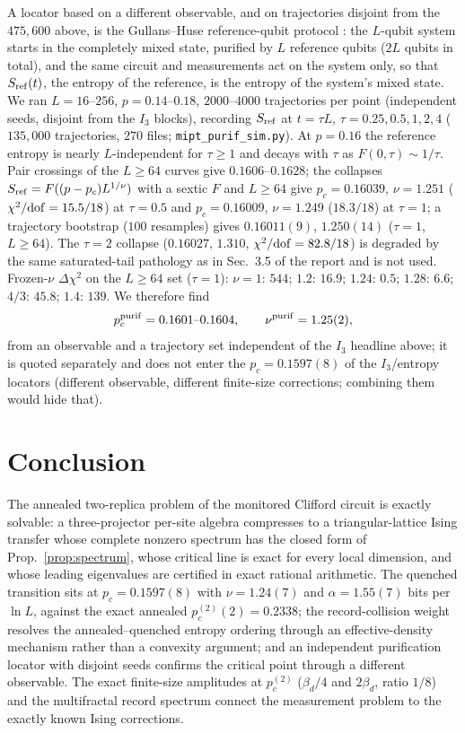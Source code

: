 \documentclass[11pt]{article}
\newcommand{\pctwo}{p_c^{(2)}}
\begin{document}
A locator based on a different observable, and on trajectories disjoint from
the $475{,}600$ above, is the Gullans--Huse reference-qubit protocol
\citep{Gullans2020}: the $L$-qubit system starts in the completely mixed
state, purified by $L$ reference qubits ($2L$ qubits in total), and the same
circuit and measurements act on the system only, so that $S_{\rm ref}(t)$,
the entropy of the reference, is the entropy of the system's mixed state.
We ran $L=16$--$256$, $p=0.14$--$0.18$, $2000$--$4000$ trajectories per
point (independent seeds, disjoint from the $I_3$ blocks), recording
$S_{\rm ref}$ at $t=\tau L$, $\tau=0.25,0.5,1,2,4$ ($135{,}000$
trajectories, $270$ files; \texttt{mipt\_purif\_sim.py}).  At $p=0.16$ the
reference entropy is nearly $L$-independent for $\tau\ge1$ and decays with
$\tau$ as $F(0,\tau)\sim1/\tau$.  Pair crossings of the $L\ge64$ curves give
$0.1606$--$0.1628$; the collapses $S_{\rm ref}=F((p-p_c)L^{1/\nu})$ with a
sextic $F$ and $L\ge64$ give $p_c=0.16039$, $\nu=1.251$
($\chi^2/{\rm dof}=15.5/18$) at $\tau=0.5$ and $p_c=0.16009$, $\nu=1.249$
($18.3/18$) at $\tau=1$; a trajectory bootstrap ($100$ resamples) gives
$0.16011(9)$, $1.250(14)$ ($\tau=1$, $L\ge64$).  The $\tau=2$ collapse
($0.16027$, $1.310$, $\chi^2/{\rm dof}=82.8/18$) is degraded by the same
saturated-tail pathology as in Sec.~3.5 of the report and is not used.
Frozen-$\nu$ $\Delta\chi^2$ on the $L\ge64$ set ($\tau=1$): $\nu=1$: $544$;
$1.2$: $16.9$; $1.24$: $0.5$; $1.28$: $6.6$; $4/3$: $45.8$; $1.4$: $139$.
We therefore find
\begin{equation}
  p_c^{\rm purif}=0.1601\text{--}0.1604,\qquad
  \nu^{\rm purif}=1.25(2),
  \label{eq:purif}
\end{equation}
from an observable and a trajectory set independent of the $I_3$ headline
above; it is quoted separately and does not enter the $p_c=0.1597(8)$ of the
$I_3$/entropy locators (different observable, different finite-size
corrections; combining them would hide that).

\section{Conclusion}\label{sec:conclusion}

The annealed two-replica problem of the monitored Clifford circuit is
exactly solvable: a three-projector per-site algebra compresses to a
triangular-lattice Ising transfer whose complete nonzero spectrum has the
closed form of Prop.~\ref{prop:spectrum}, whose critical line is exact for
every local dimension, and whose leading eigenvalues are certified in exact
rational arithmetic.  The quenched transition sits at $p_c=0.1597(8)$ with
$\nu=1.24(7)$ and $\alpha=1.55(7)$ bits per $\ln L$, against the exact
annealed $\pctwo(2)=0.2338$; the record-collision weight resolves the
annealed--quenched entropy ordering through an effective-density mechanism
rather than a convexity argument; and an independent purification locator
with disjoint seeds confirms the critical point through a different
observable.  The exact finite-size amplitudes at $\pctwo$
($\beta_d/4$ and $2\beta_d$, ratio $1/8$) and the multifractal record
spectrum connect the measurement problem to the exactly known Ising
corrections.
\end{document}
